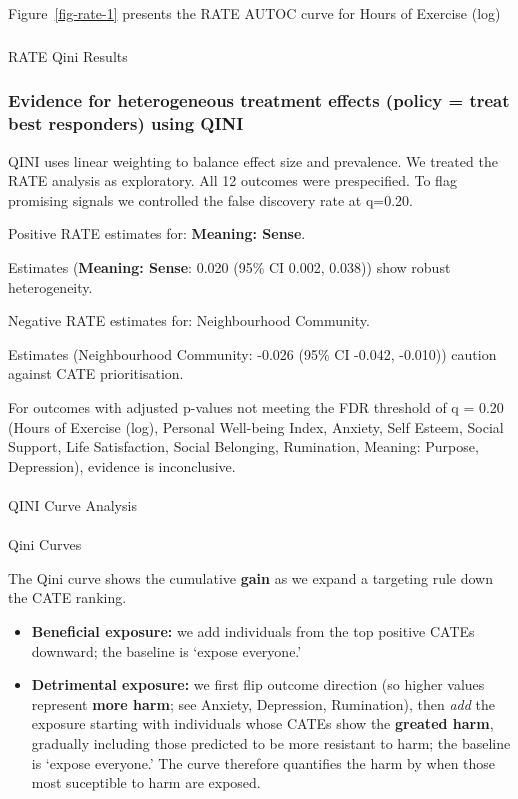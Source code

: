 \documentclass[
  single column]{article}
\makeatletter
\let\oldparagraph\paragraph
\renewcommand{\paragraph}{
    \@ifstar
      \xxxParagraphStar
      \xxxParagraphNoStar
  }
\newcommand{\xxxParagraphStar}[1]{\oldparagraph*{#1}\mbox{}}
\newcommand{\xxxParagraphNoStar}[1]{\oldparagraph{#1}\mbox{}}
\let\oldsubparagraph\subparagraph
\renewcommand{\subparagraph}{
    \@ifstar
      \xxxSubParagraphStar
      \xxxSubParagraphNoStar
  }
\newcommand{\xxxSubParagraphStar}[1]{\oldsubparagraph*{#1}\mbox{}}
\newcommand{\xxxSubParagraphNoStar}[1]{\oldsubparagraph{#1}\mbox{}}
\providecommand{\tightlist}{%
  \setlength{\itemsep}{0pt}\setlength{\parskip}{0pt}}
\makeatother
\begin{document}
Figure~\ref{fig-rate-1} presents the RATE AUTOC curve for Hours of
Exercise (log)

\subparagraph{RATE Qini Results}\label{rate-qini-results}

\subsubsection{Evidence for heterogeneous treatment effects (policy =
treat best responders) using
QINI}\label{evidence-for-heterogeneous-treatment-effects-policy-treat-best-responders-using-qini}

QINI uses linear weighting to balance effect size and prevalence. We
treated the RATE analysis as exploratory. All 12 outcomes were
prespecified. To flag promising signals we controlled the false
discovery rate at q=0.20.

Positive RATE estimates for: \textbf{Meaning: Sense}.

Estimates (\textbf{Meaning: Sense}: 0.020 (95\% CI 0.002, 0.038)) show
robust heterogeneity.

Negative RATE estimates for: Neighbourhood Community.

Estimates (Neighbourhood Community: -0.026 (95\% CI -0.042, -0.010))
caution against CATE prioritisation.

For outcomes with adjusted p-values not meeting the FDR threshold of q =
0.20 (Hours of Exercise (log), Personal Well-being Index, Anxiety, Self
Esteem, Social Support, Life Satisfaction, Social Belonging, Rumination,
Meaning: Purpose, Depression), evidence is inconclusive.

\paragraph{QINI Curve Analysis}\label{qini-curve-analysis}

\paragraph{Qini Curves}\label{qini-curves}

The Qini curve shows the cumulative \textbf{gain} as we expand a
targeting rule down the CATE ranking.

\begin{itemize}
\tightlist
\item
  \textbf{Beneficial exposure:} we add individuals from the top positive
  CATEs downward; the baseline is `expose everyone.'
\item
  \textbf{Detrimental exposure:} we first flip outcome direction (so
  higher values represent \textbf{more harm}; see Anxiety, Depression,
  Rumination), then \emph{add} the exposure starting with individuals
  whose CATEs show the \textbf{greated harm}, gradually including those
  predicted to be more resistant to harm; the baseline is `expose
  everyone.' The curve therefore quantifies the harm by when those most
  suceptible to harm are exposed.
\end{itemize}
\end{document}

